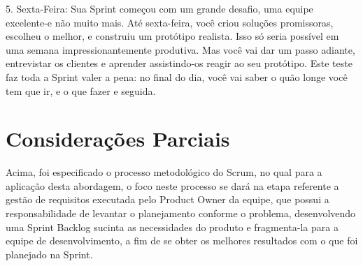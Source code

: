 5. Sexta-Feira: Sua Sprint começou com um grande desafio, uma equipe excelente-e não muito mais. Até sexta-feira, você criou soluções promissoras, escolheu o melhor, e construiu um protótipo realista. Isso só seria possível em uma semana impressionantemente produtiva. Mas você vai dar um passo adiante, entrevistar os clientes e aprender assistindo-os reagir ao seu protótipo. Este teste faz toda a Sprint valer a pena: no final do dia, você vai saber o quão longe você tem que ir, e o que fazer e seguida.

\section{Considerações Parciais}

Acima, foi especificado o processo metodológico do Scrum, no qual para a aplicação desta abordagem, o foco neste processo se dará na etapa referente a gestão de requisitos executada pelo Product Owner da equipe, que possui a responsabilidade de levantar o planejamento conforme o problema, desenvolvendo uma Sprint Backlog sucinta as necessidades do produto e fragmenta-la para a equipe de desenvolvimento, a fim de se obter os melhores resultados com o que foi planejado na Sprint.

